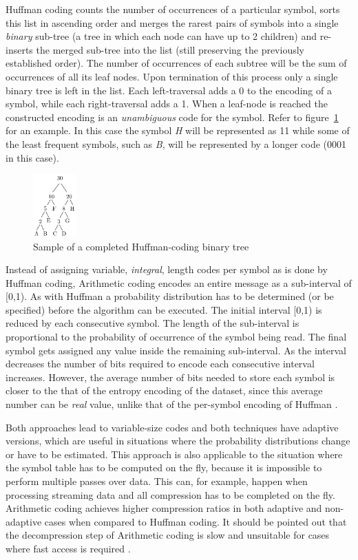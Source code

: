 Huffman coding counts the number of occurrences of a particular symbol, sorts this list in ascending order and merges the rarest pairs of symbols into a single \textit{binary} 
sub-tree (a tree in which each node can have up to 2 children) and re-inserts the merged sub-tree into the list (still preserving the previously established order). The number of occurrences 
of each subtree will be the sum of occurrences of all its leaf nodes. Upon termination of this process only a single binary tree is left in the list. Each left-traversal adds a 0 to the encoding 
of a symbol, while each right-traversal adds a 1. When a leaf-node is reached the constructed encoding is an \textit{unambiguous} code for the symbol. Refer to figure~\ref{HUFFMAN} for an example.
In this case the symbol \textit{H} will be represented as 11 while some of the least frequent symbols, such as \textit{B}, will be represented by a longer code (0001 in this case).
\begin{figure}[h!]
 \centering
 \includegraphics[width=0.15\textwidth]{huffmanTree.png}
 \caption{Sample of a completed Huffman-coding binary tree \cite[p. 70]{salomon2004data}}
 \label{HUFFMAN}
\end{figure}

Instead of assigning variable, \textit{integral}, length codes per symbol as is done by Huffman coding, Arithmetic coding encodes an entire message as a sub-interval of [0,1). As with
Huffman a probability distribution has to be determined (or be specified) before the algorithm can be executed. The initial interval [0,1) is reduced by each consecutive 
symbol. The length of the sub-interval is proportional to the probability of occurrence of the symbol being read. The final symbol gets assigned any value inside the remaining 
sub-interval. As the interval decreases the number of bits required to encode each consecutive interval increases. However, the average number of bits needed to store 
each symbol is closer to the that of the entropy encoding of the dataset, since this average number can be \textit{real} value, unlike that of the per-symbol encoding of Huffman \cite[ch. 2]{salomon2004data}.

Both approaches lead to variable-size codes and both techniques have adaptive versions, which are useful in situations where the probability distributions change or have to be estimated. 
This approach is also applicable to the situation where the symbol table has to be computed on the fly, because it is impossible to perform multiple passes over data. This can, for example,
happen when processing streaming data and all compression has to be completed on the fly. Arithmetic coding achieves higher compression ratios in both adaptive and non-adaptive cases 
when compared to Huffman coding. It should be pointed out that the decompression step of Arithmetic coding is slow and unsuitable for cases where fast access is 
required \cite{ray1995database,williams1999compressing}\cite[ch. 2]{salomon2004data}.

